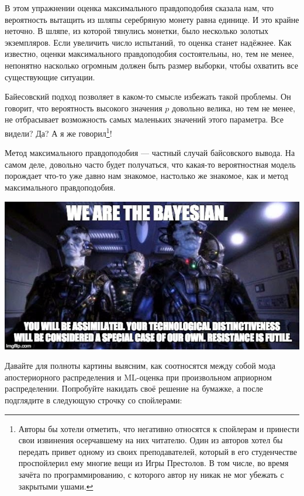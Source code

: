 \documentclass[12pt, a4paper, oneside]{extreport}
\theoremstyle{plain}              %
\theoremstyle{definition}         %
\begin{document}
В этом упражнении оценка максимального правдоподобия сказала нам, что вероятность вытащить из шляпы серебряную монету равна единице. И это крайне неточно. В шляпе, из которой тянулись монетки, было несколько золотых экземпляров. Если увеличить число испытаний, то оценка станет надёжнее. Как известно, оценки максимального правдоподобия состоятельны, но, тем не менее, непонятно насколько огромным должен быть размер выборки, чтобы охватить все существующие ситуации. 

Байесовский подход позволяет в каком-то смысле избежать такой проблемы. Он говорит, что вероятность высокого значения $p$ довольно велика, но тем не менее, не отбрасывает возможность самых маленьких значений этого параметра.  Все видели? Да? А я же говорил\footnote{Авторы бы хотели отметить, что негативно относятся к спойлерам и принести свои извинения осерчавшему на них читателю. Один из авторов хотел бы передать привет одному из своих преподавателей, который в его студенчестве проспойлерил ему многие вещи из Игры Престолов. В том числе, во время зачёта по программированию, с которого автор ну никак не мог убежать с закрытыми ушами.}!

Метод максимального правдоподобия --- частный случай байсовского вывода. На самом деле, довольно часто будет получаться, что какая-то вероятностная модель порождает что-то уже давно нам знакомое, настолько же знакомое, как и метод максимального правдоподобия. 

\begin{center}
\includegraphics[scale=0.6]{bayesians.jpg}
\end{center} 

Давайте для полноты картины выясним, как соотносятся между собой мода апостериорного распределения и ML-оценка при произвольном априорном распределении. Попробуйте накидать своё решение на бумажке, а после подглядите в следующую строчку со спойлерами:  
\end{document}
